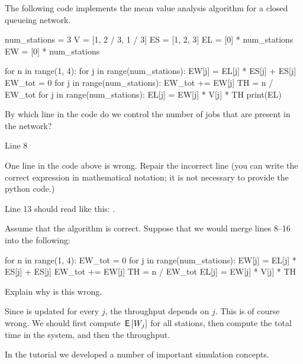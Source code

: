 The following code implements the mean value analysis algorithm for a closed queueing network.

\begin{pyverbatim}[stdout][numbers=left]
num_stations = 3
V = [1, 2 / 3, 1 / 3]
ES = [1, 2, 3]
EL = [0] * num_stations
EW = [0] * num_stations


for n in range(1, 4):
 for j in range(num_stations):
 EW[j] = EL[j] * ES[j] + ES[j]
 EW_tot = 0
 for j in range(num_stations):
 EW_tot += EW[j]
 TH = n / EW_tot
 for j in range(num_stations):
 EL[j] = EW[j] * V[j] * TH
 print(EL)

 \end{pyverbatim} 

\begin{exercise}[201904]
 By which line in the code do we control the number of jobs that are present in the network?
\begin{solution}
 Line 8
\end{solution}
\end{exercise}

\begin{exercise}[201904]
 One line in the code above is wrong.
 Repair the incorrect line (you can write the correct expression in mathematical notation; it is not necessary to provide the python code.)
\begin{solution}
Line 13 should read like this: .
\end{solution}
\end{exercise}

\begin{exercise}[201904]
 Assume that the algorithm is correct.
 Suppose that we would merge lines 8--16 into the following:
\begin{pyverbatim}[stdout][numbers=left]
for n in range(1, 4):
 EW_tot = 0
 for j in range(num_stations):
 EW[j] = EL[j] * ES[j] + ES[j]
 EW_tot += EW[j]
 TH = n / EW_tot
 EL[j] = EW[j] * V[j] * TH
 \end{pyverbatim}
 Explain why is this wrong.
\begin{solution}
Since  is updated for every $j$, the throughput depends on $j$. This is of course wrong. We should first compute $\,\mathsf{E}\left[W_j\right]$ for all stations, then compute the total time in the system, and then the throughput. 
\end{solution}
\end{exercise} 

In the tutorial we developed a number of important simulation concepts.

